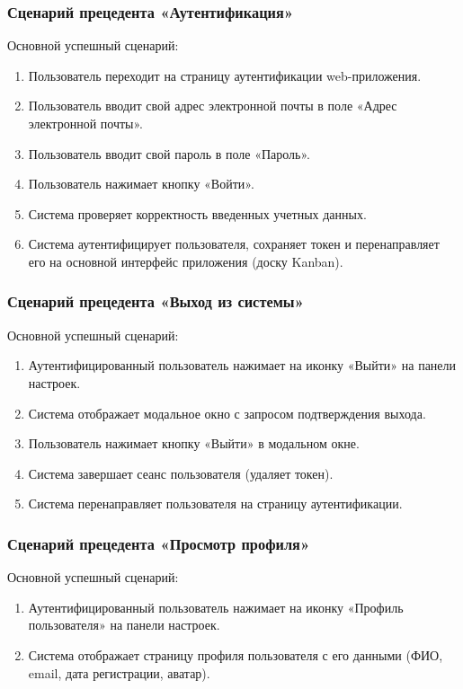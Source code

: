 \subsubsection{Сценарий прецедента «Аутентификация»}
Основной успешный сценарий:
\begin{enumerate}
	\item Пользователь переходит на страницу аутентификации web-приложения.
	\item Пользователь вводит свой адрес электронной почты в поле «Адрес электронной почты».
	\item Пользователь вводит свой пароль в поле «Пароль».
	\item Пользователь нажимает кнопку «Войти».
	\item Система проверяет корректность введенных учетных данных.
	\item Система аутентифицирует пользователя, сохраняет токен и перенаправляет его на основной интерфейс приложения (доску Kanban).
\end{enumerate}

\subsubsection{Сценарий прецедента «Выход из системы»}
Основной успешный сценарий:
\begin{enumerate}
	\item Аутентифицированный пользователь нажимает на иконку «Выйти» на панели настроек.
	\item Система отображает модальное окно с запросом подтверждения выхода.
	\item Пользователь нажимает кнопку «Выйти» в модальном окне.
	\item Система завершает сеанс пользователя (удаляет токен).
	\item Система перенаправляет пользователя на страницу аутентификации.
\end{enumerate}

\subsubsection{Сценарий прецедента «Просмотр профиля»}
Основной успешный сценарий:
\begin{enumerate}
	\item Аутентифицированный пользователь нажимает на иконку «Профиль пользователя» на панели настроек.
	\item Система отображает страницу профиля пользователя с его данными (ФИО, email, дата регистрации, аватар).
\end{enumerate}

